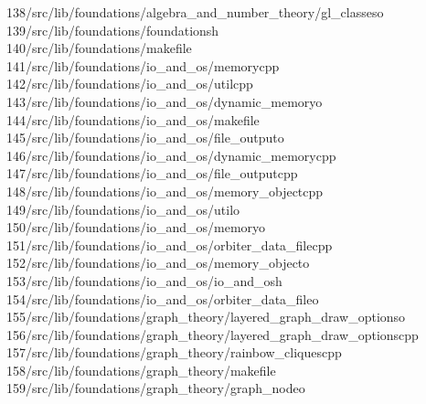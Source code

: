 \begin{tabbing}
138\>/src/lib/foundations/algebra\_and\_number\_theory/gl\_classeso\\[0pt]
139\>/src/lib/foundations/foundationsh\\[0pt]
140\>/src/lib/foundations/makefile\\[0pt]
141\>/src/lib/foundations/io\_and\_os/memorycpp\\[0pt]
142\>/src/lib/foundations/io\_and\_os/utilcpp\\[0pt]
143\>/src/lib/foundations/io\_and\_os/dynamic\_memoryo\\[0pt]
144\>/src/lib/foundations/io\_and\_os/makefile\\[0pt]
145\>/src/lib/foundations/io\_and\_os/file\_outputo\\[0pt]
146\>/src/lib/foundations/io\_and\_os/dynamic\_memorycpp\\[0pt]
147\>/src/lib/foundations/io\_and\_os/file\_outputcpp\\[0pt]
148\>/src/lib/foundations/io\_and\_os/memory\_objectcpp\\[0pt]
149\>/src/lib/foundations/io\_and\_os/utilo\\[0pt]
150\>/src/lib/foundations/io\_and\_os/memoryo\\[0pt]
151\>/src/lib/foundations/io\_and\_os/orbiter\_data\_filecpp\\[0pt]
152\>/src/lib/foundations/io\_and\_os/memory\_objecto\\[0pt]
153\>/src/lib/foundations/io\_and\_os/io\_and\_osh\\[0pt]
154\>/src/lib/foundations/io\_and\_os/orbiter\_data\_fileo\\[0pt]
155\>/src/lib/foundations/graph\_theory/layered\_graph\_draw\_optionso\\[0pt]
156\>/src/lib/foundations/graph\_theory/layered\_graph\_draw\_optionscpp\\[0pt]
157\>/src/lib/foundations/graph\_theory/rainbow\_cliquescpp\\[0pt]
158\>/src/lib/foundations/graph\_theory/makefile\\[0pt]
159\>/src/lib/foundations/graph\_theory/graph\_nodeo\\[0pt]

\end{tabbing}
